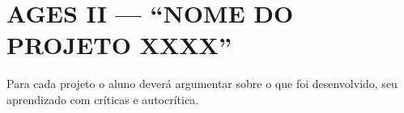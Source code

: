 \chapter[AGES II --- “NOME DO PROJETO XXXX”]{AGES II --- “NOME DO PROJETO XXXX”}

Para cada projeto o aluno deverá argumentar sobre o que foi desenvolvido,
seu aprendizado com críticas e autocrítica.




